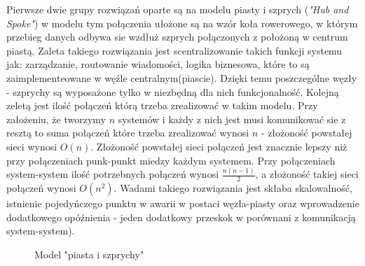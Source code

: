 Pierwsze dwie grupy rozwiązań oparte są na modelu piasty i szprych (\textit{"Hub and Spoke"}) w modelu tym połączenia ułożone są na wzór koła rowerowego, w którym przebieg danych odbywa sie wzdłuż szprych połączonych z położoną w centrum piastą. Zaleta takiego rozwiązania jest scentralizowanie takich funkcji systemu jak: zarządzanie, routowanie wiadomości, logika biznesowa, które to są zaimplementeowane w węźle centralnym(piascie). Dzięki temu poszczególne węzły - szprychy są wyposażone tylko w niezbędną dla nich funkcjonalność. Kolejną zeletą jest ilość połączeń którą trzeba zrealizować w takim modelu. Przy założeniu, że tworzymy \begin{math}n\end{math} systemów i każdy z nich jest musi komunikować sie z resztą to suma połączeń które trzeba zrealizować wynosi \begin{math}n\end{math} - złożoność powstałej sieci wynosi \begin{math}O(n)\end{math}. Złożoność powstałej sieci połączeń jest znacznie lepszy niż przy połączeniach punk-punkt miedzy każdym systemem. Przy połączeniach system-system  ilość potrzebnych połączeń wynosi  \begin{math}\frac{n (n- 1)}{2}\end{math}, a złożoność takiej sieci połączeń wynosi  \begin{math}O(n^2)\end{math}. Wadami takiego rozwiązania jest skłaba skalowalność, istnienie pojedyńczego punktu w awarii w postaci węzła-piasty oraz wprowadzenie dodatkowego opóźnienia - jeden dodatkowy przeskok w porównani z komunikacją system-system).

\setlength\fboxsep{20pt}
\setlength\fboxrule{1pt}
\begin{figure}[!h]
	\centering
	\caption{Model "piasta i szprychy"}\label{fig:hub_and_spoke}
\end{figure}

